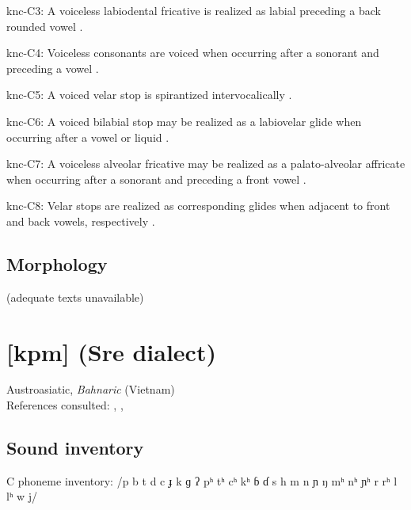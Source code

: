 {\begin{appendixdesc}
\item[knc-C3:] A voiceless labiodental fricative is realized as labial preceding a back rounded vowel \citep[23]{Cyffer1998}.

\item[knc-C4:] Voiceless consonants are voiced when occurring after a sonorant and preceding a vowel \citep[22]{Cyffer1998}.

\item[knc-C5:] A voiced velar stop is spirantized intervocalically \citep[22]{Cyffer1998}.

\item[knc-C6:] A voiced bilabial stop may be realized as a labiovelar glide when occurring after a vowel or liquid \citep[22]{Cyffer1998}.

\item[knc-C7:] A voiceless alveolar fricative may be realized as a palato-alveolar affricate when occurring after a sonorant and preceding a front vowel \citep[21]{Cyffer1998}.

\item[knc-C8:] Velar stops are realized as corresponding glides when adjacent to front and back vowels, respectively \citep[22]{Cyffer1998}.
\end{appendixdesc}
\subsection*{Morphology}

(adequate texts unavailable)

\section*{[kpm]  (Sre dialect)}   %
Austroasiatic, \textit{Bahnaric} (Vietnam)\medskip\\
References consulted: \citet{LadefogedMaddieson1996}, \citet{Manley1972}, \citet{Olsen2014}

\subsection*{Sound inventory}
\begin{appendixdesc}

\item[C phoneme inventory:] /p b t d c ɟ k ɡ ʔ pʰ tʰ cʰ kʰ ɓ ɗ s h m n ɲ ŋ mʰ nʰ ɲʰ r rʰ l lʰ w j/


\end{appendixdesc}}
